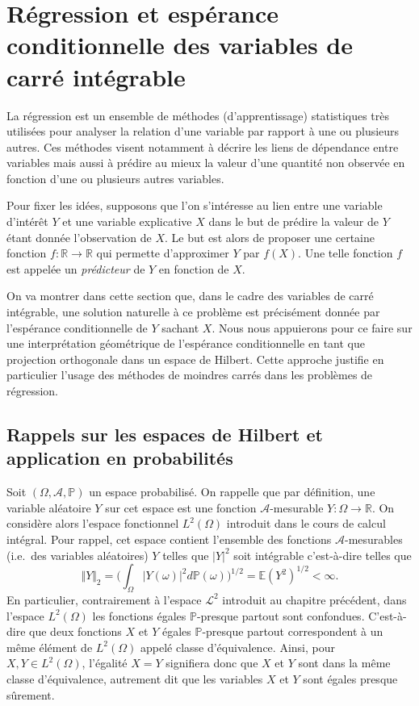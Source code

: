 \chapter{Régression et espérance conditionnelle des variables de carré
intégrable}\label{III-ruxe9gression-et-espuxe9rance-conditionnelle-des-variables-de-carruxe9-intuxe9grable}

La régression est un ensemble de méthodes (d'apprentissage) statistiques
très utilisées pour analyser la relation d'une variable par rapport à
une ou plusieurs autres. Ces méthodes visent notamment à décrire les
liens de dépendance entre variables mais aussi à prédire au mieux la
valeur d'une quantité non observée en fonction d'une ou plusieurs autres
variables.

Pour fixer les idées, supposons que l'on s'intéresse au lien entre une
variable d'intérêt \(Y\) et une variable explicative \(X\) dans le but
de prédire la valeur de \(Y\) étant donnée l'observation de \(X\). Le
but est alors de proposer une certaine fonction
\(f : \mathbb{R}\rightarrow \mathbb{R}\) qui permette d'approximer \(Y\)
par \(f(X)\). Une telle fonction \(f\) est appelée un \emph{prédicteur}
de \(Y\) en fonction de \(X\).

On va montrer dans cette section que, dans le cadre des variables de
carré intégrable, une solution naturelle à ce problème est précisément
donnée par l'espérance conditionnelle de \(Y\) sachant \(X\). Nous nous
appuierons pour ce faire sur une interprétation géométrique de
l'espérance conditionnelle en tant que projection orthogonale dans un
espace de Hilbert. Cette approche justifie en particulier l'usage des
méthodes de moindres carrés dans les problèmes de régression.

\section{Rappels sur les espaces de Hilbert et application en
probabilités}\label{III-rappels-sur-les-espaces-de-hilbert-et-application-en-probabilituxe9s}

Soit \((\Omega, \mathcal{A},\mathbb{P})\) un espace probabilisé. On
rappelle que par définition, une variable aléatoire \(Y\) sur cet espace
est une fonction \(\mathcal{A}\)-mesurable
\(Y : \Omega \rightarrow \mathbb{R}\). On considère alors l'espace
fonctionnel \(L^2(\Omega)\) introduit dans le cours de calcul intégral.
Pour rappel, cet espace contient l'ensemble des fonctions
\(\mathcal{A}\)-mesurables (i.e.~des variables aléatoires) \(Y\) telles
que \(\vert Y\vert^2\) soit intégrable c'est-à-dire telles que \[
\Vert Y\Vert_2 = \bigg(\int_{\Omega} \vert Y(\omega)\vert^2 d\mathbb{P}(\omega)\bigg)^{1/2}=\mathbb{E}(Y^2)^{1/2} < \infty.
\] En particulier, contrairement à l'espace \(\mathcal{L}^2\) introduit
au chapitre précédent, dans l'espace \(L^2(\Omega)\) les fonctions
égales \(\mathbb{P}\)-presque partout sont confondues. C'est-à-dire que
deux fonctions \(X\) et \(Y\) égales \(\mathbb{P}\)-presque partout
correspondent à un même élément de \(L^2(\Omega)\) appelé classe
d'équivalence. Ainsi, pour \(X, Y \in L^2(\Omega)\), l'égalité \(X=Y\)
signifiera donc que \(X\) et \(Y\) sont dans la même classe
d'équivalence, autrement dit que les variables \(X\) et \(Y\) sont
égales presque sûrement.

